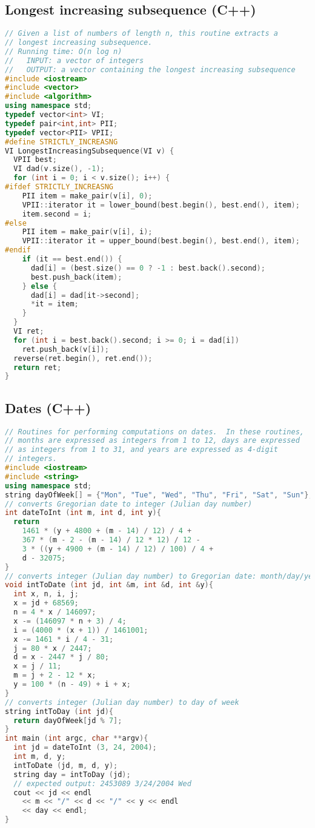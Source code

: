 \subsection{Longest increasing subsequence (C++)}
\begin{lstlisting}[language=C++]
// Given a list of numbers of length n, this routine extracts a 
// longest increasing subsequence.
// Running time: O(n log n)
//   INPUT: a vector of integers
//   OUTPUT: a vector containing the longest increasing subsequence
#include <iostream>
#include <vector>
#include <algorithm>
using namespace std;
typedef vector<int> VI;
typedef pair<int,int> PII;
typedef vector<PII> VPII;
#define STRICTLY_INCREASNG
VI LongestIncreasingSubsequence(VI v) {
  VPII best;
  VI dad(v.size(), -1);
  for (int i = 0; i < v.size(); i++) {
#ifdef STRICTLY_INCREASNG
    PII item = make_pair(v[i], 0);
    VPII::iterator it = lower_bound(best.begin(), best.end(), item);
    item.second = i;
#else
    PII item = make_pair(v[i], i);
    VPII::iterator it = upper_bound(best.begin(), best.end(), item);
#endif
    if (it == best.end()) {
      dad[i] = (best.size() == 0 ? -1 : best.back().second);
      best.push_back(item);
    } else {
      dad[i] = dad[it->second];
      *it = item;
    }
  }
  VI ret;
  for (int i = best.back().second; i >= 0; i = dad[i])
    ret.push_back(v[i]);
  reverse(ret.begin(), ret.end());
  return ret;
}
\end{lstlisting}
\subsection{Dates (C++)}
\begin{lstlisting}[language=C++]
// Routines for performing computations on dates.  In these routines,
// months are expressed as integers from 1 to 12, days are expressed
// as integers from 1 to 31, and years are expressed as 4-digit
// integers.
#include <iostream>
#include <string>
using namespace std;
string dayOfWeek[] = {"Mon", "Tue", "Wed", "Thu", "Fri", "Sat", "Sun"};
// converts Gregorian date to integer (Julian day number)
int dateToInt (int m, int d, int y){  
  return 
    1461 * (y + 4800 + (m - 14) / 12) / 4 +
    367 * (m - 2 - (m - 14) / 12 * 12) / 12 - 
    3 * ((y + 4900 + (m - 14) / 12) / 100) / 4 + 
    d - 32075;
}
// converts integer (Julian day number) to Gregorian date: month/day/year
void intToDate (int jd, int &m, int &d, int &y){
  int x, n, i, j; 
  x = jd + 68569;
  n = 4 * x / 146097;
  x -= (146097 * n + 3) / 4;
  i = (4000 * (x + 1)) / 1461001;
  x -= 1461 * i / 4 - 31;
  j = 80 * x / 2447;
  d = x - 2447 * j / 80;
  x = j / 11;
  m = j + 2 - 12 * x;
  y = 100 * (n - 49) + i + x;
}
// converts integer (Julian day number) to day of week
string intToDay (int jd){
  return dayOfWeek[jd % 7];
}
int main (int argc, char **argv){
  int jd = dateToInt (3, 24, 2004);
  int m, d, y;
  intToDate (jd, m, d, y);
  string day = intToDay (jd);
  // expected output: 2453089 3/24/2004 Wed
  cout << jd << endl
    << m << "/" << d << "/" << y << endl
    << day << endl;
}
\end{lstlisting}
